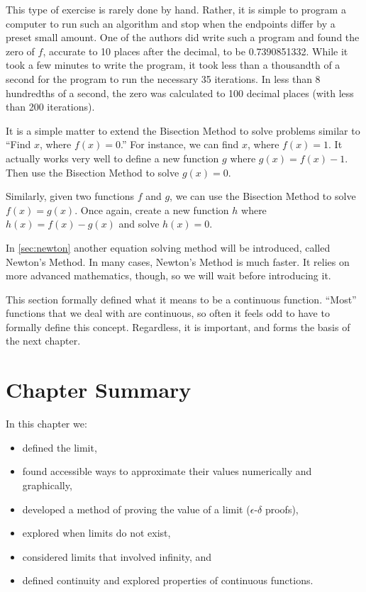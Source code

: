 \begin{example}
This type of exercise is rarely done by hand. Rather, it is simple to program a computer to run such an algorithm and stop when the endpoints differ by a preset small amount. One of the authors did write such a program and found the zero of $f$, accurate to 10 places after the decimal, to be 0.7390851332. While it took a few minutes to write the program, it took less than a thousandth of a second for the program to run the necessary 35 iterations. In less than 8 hundredths of a second, the zero was calculated to 100 decimal places (with less than 200 iterations).
\end{example}

It is a simple matter to extend the Bisection Method to solve problems similar to ``Find $x$, where $f(x) = 0$.'' For instance, we can find $x$, where $f(x) = 1$. %
It actually works very well to define a new function $g$ where $g(x) = f(x) - 1$. Then use the Bisection Method to solve $g(x)=0$.  

Similarly, given two functions $f$ and $g$, we can use the Bisection Method to solve $f(x) = g(x)$. Once again, create a new function $h$ where $h(x) = f(x)-g(x)$ and solve $h(x) = 0$. 

In \autoref{sec:newton} another equation solving method will be introduced, called Newton's Method. In many cases, Newton's Method is much faster. It relies on more advanced mathematics, though, so we will wait before introducing it. 

This section formally defined what it means to be a continuous function. ``Most'' functions that we deal with are continuous, so often it feels odd to have to formally define this concept. Regardless, it is important, and forms the basis of the next chapter.

\section*{Chapter Summary}

In this chapter we:
\begin{itemize}
\item defined the limit, 
\item found accessible ways to approximate their values numerically and graphically, 
\item	developed a method of proving the value of a limit ($\epsilon$-$\delta$ proofs),
\item	explored when limits do not exist,
\item	considered limits that involved infinity, and
\item	defined continuity and explored properties of continuous functions.
\end{itemize}

